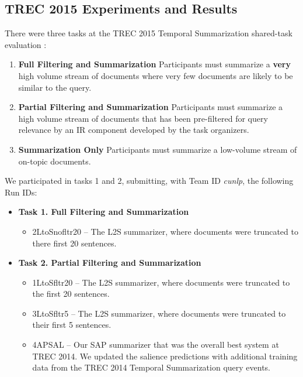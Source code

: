 \subsection{TREC 2015 Experiments and Results}

There were three tasks at the TREC 2015 Temporal Summarization
shared-task evaluation \citep{aslam2016}:
\begin{enumerate}
\item  \textbf{Full Filtering and Summarization} Participants must summarize
a \textbf{very} high volume stream of documents where very few documents are 
likely to be similar to the query.
\item  \textbf{Partial Filtering and Summarization} Participants must summarize
a high volume stream of documents that has been pre-filtered for query
relevance
by an IR component developed by the task organizers.
\item \textbf{Summarization Only} Participants must summarize a low-volume
stream of on-topic documents.
\end{enumerate}

We participated in tasks 1 and 2, submitting, with Team ID \textit{cunlp},
the following Run IDs:

\begin{itemize}
\item \textbf{Task 1. Full Filtering and Summarization}
\begin{itemize}
    \item  2LtoSnofltr20 -- The L2S summarizer, where documents were
truncated to there first 20 sentences.
\end{itemize}
\item \textbf{Task 2. Partial Filtering and Summarization}
\begin{itemize}
\item  1LtoSfltr20 -- The L2S summarizer, where documents were
truncated to the first 20 sentences.
\item  3LtoSfltr5 -- The L2S summarizer, where documents were truncated to 
their first 5 sentences.
\item  4APSAL -- Our SAP summarizer that was the overall best system 
    at TREC 2014. We updated the salience predictions with additional training
data from the TREC 2014 Temporal Summarization query events.
\end{itemize}
\end{itemize}

